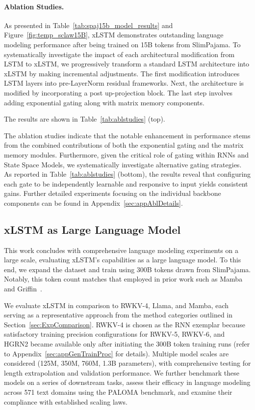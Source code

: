 \paragraph{Ablation Studies.}
As presented in Table~\ref{tab:spaj15b_model_results} and Figure~\ref{fig:temp_sclaw15B}, xLSTM demonstrates outstanding language modeling performance after being trained on 15B tokens from SlimPajama. To systematically investigate the impact of each architectural modification from LSTM to xLSTM, we progressively transform a standard LSTM architecture into xLSTM by making incremental adjustments. The first modification introduces LSTM layers into pre-LayerNorm residual frameworks. Next, the architecture is modified by incorporating a post up-projection block. The last step involves adding exponential gating along with matrix memory components.

The results are shown in Table~\ref{tab:ablstudies} (top). 

The ablation studies indicate that the notable enhancement in performance stems from the combined contributions of both the exponential gating and the matrix memory modules. Furthermore, given the critical role of gating within RNNs and State Space Models, we systematically investigate alternative gating strategies. As reported in Table~\ref{tab:ablstudies} (bottom), the results reveal that configuring each gate to be independently learnable and responsive to input yields consistent gains. Further detailed experiments focusing on the individual backbone components can be found in Appendix~\ref{sec:appAblDetails}.

\subsection{xLSTM as Large Language Model}
\label{sec:ExpLanguage}

This work concludes with comprehensive language modeling experiments on a large scale, evaluating xLSTM's capabilities as a large language model. To this end, we expand the dataset and train using 300B tokens drawn from SlimPajama. Notably, this token count matches that employed in prior work such as Mamba~\citep{Gu:24arxiv} and Griffin~\citep{De:24arxiv}.

We evaluate xLSTM in comparison to RWKV-4, Llama, and Mamba, each serving as a representative approach from the method categories outlined in Section~\ref{sec:ExpComparison}. RWKV-4 is chosen as the RNN exemplar because satisfactory training precision configurations for RWKV-5, RWKV-6, and HGRN2 became available only after initiating the 300B token training runs (refer to Appendix~\ref{sec:appGenTrainProc} for details). Multiple model scales are considered (125M, 350M, 760M, 1.3B parameters), with comprehensive testing for length extrapolation and validation performance. We further benchmark these models on a series of downstream tasks, assess their efficacy in language modeling across 571 text domains using the PALOMA benchmark, and examine their compliance with established scaling laws.

